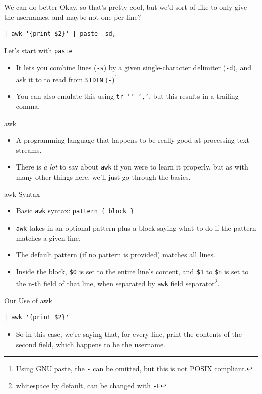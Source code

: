 \documentclass[12pt]{beamer}
\begin{document}
\begin{frame}[fragile]{We can do better}
  Okay, so that’s pretty cool, but we’d sort of like to only give the usernames, and maybe not one per line?
  \begin{verbatim}
| awk '{print $2}' | paste -sd, -
  \end{verbatim}
  Let's start with \texttt{paste}
  \begin{itemize}
    \item It lets you combine lines (\texttt{-s}) by a given single-character delimiter (\texttt{-d}), and ask it to to read from \texttt{STDIN} (\texttt{-})\footnote{Using GNU paste, the \texttt{-} can be omitted, but this is not POSIX compliant.}
    \item You can also emulate this using \texttt{tr '\n' ','}, but this results in a trailing comma.
  \end{itemize}
\end{frame}

\begin{frame}{awk}
  \begin{itemize}
    \item A programming language that happens to be really good at processing text streams.
    \item There is \emph{a lot} to say about \texttt{awk} if you were to learn it properly, but as with many other things here, we’ll just go through the basics.
  \end{itemize}
\end{frame}

\begin{frame}{awk Syntax}
  \begin{itemize}
    \item Basic \texttt{awk} syntax: \texttt{pattern \{ block \}}
    \item \texttt{awk} takes in an optional pattern plus a block saying what to do if the pattern matches a given line.
    \item The default pattern (if no pattern is provided) matches all lines.
    \item Inside the block, \texttt{\$0} is set to the entire line's content, and \texttt{\$1} to \texttt{\$n} is set to the n-th field of that line, when separated by \texttt{awk} field separator\footnote{whitespace by default, can be changed with \texttt{-F}}.
  \end{itemize}
\end{frame}

\begin{frame}[fragile]{Our Use of awk}
  \begin{verbatim}
| awk '{print $2}'
  \end{verbatim}
  \begin{itemize}
    \item So in this case, we're saying that, for every line, print the contents of the second field, which happens to be the username.
  \end{itemize}
\end{frame}
\end{document}
